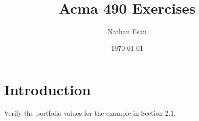 \documentclass{article}
\title{Acma 490 Exercises}
\author{Nathan Esau}
\date{\today}
\numberwithin{questioncounter}{section}
\begin{document}


\thispagestyle{empty}

\maketitle

\tableofcontents

\newpage

\setcounter{section}{1}
\section{Introduction}

\begin{question}
Verify the portfolio values for the example in Section 2.1.
\end{question}
\end{document}
